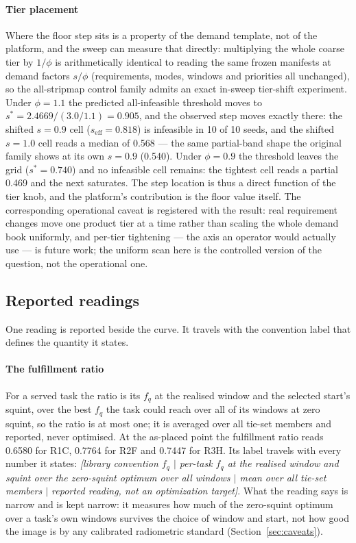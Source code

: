 \documentclass[preprint,authoryear]{elsarticle}
\begin{document}
\paragraph{Tier placement} Where the floor step sits is a property of the demand template, not of the platform, and the sweep can measure that directly: multiplying the whole coarse tier by $1/\phi$ is arithmetically identical to reading the same frozen manifests at demand factors $s/\phi$ (requirements, modes, windows and priorities all unchanged), so the all-stripmap control family admits an exact in-sweep tier-shift experiment. Under $\phi=1.1$ the predicted all-infeasible threshold moves to $s^{*}=2.4669/(3.0/1.1)=0.905$, and the observed step moves exactly there: the shifted $s=0.9$ cell ($s_{\mathrm{eff}}=0.818$) is infeasible in 10 of 10 seeds, and the shifted $s=1.0$ cell reads a median of 0.568 --- the same partial-band shape the original family shows at its own $s=0.9$ (0.540). Under $\phi=0.9$ the threshold leaves the grid ($s^{*}=0.740$) and no infeasible cell remains: the tightest cell reads a partial 0.469 and the next saturates. The step location is thus a direct function of the tier knob, and the platform's contribution is the floor value itself. The corresponding operational caveat is registered with the result: real requirement changes move one product tier at a time rather than scaling the whole demand book uniformly, and per-tier tightening --- the axis an operator would actually use --- is future work; the uniform scan here is the controlled version of the question, not the operational one.

\subsection{Reported readings}\label{sec:readings}

One reading is reported beside the curve. It travels with the convention label that defines the quantity it states.

\paragraph{The fulfillment ratio} For a served task the ratio is its $f_q$ at the realised window and the selected start's squint, over the best $f_q$ the task could reach over all of its windows at zero squint, so the ratio is at most one; it is averaged over all tie-set members and reported, never optimised. At the as-placed point the fulfillment ratio reads 0.6580 for R1C, 0.7764 for R2F and 0.7447 for R3H. Its label travels with every number it states: \emph{[library convention $f_q$ $\mid$ per-task $f_q$ at the realised window and squint over the zero-squint optimum over all windows $\mid$ mean over all tie-set members $\mid$ reported reading, not an optimization target]}. What the reading says is narrow and is kept narrow: it measures how much of the zero-squint optimum over a task's own windows survives the choice of window and start, not how good the image is by any calibrated radiometric standard (Section~\ref{sec:caveats}).
\end{document}
